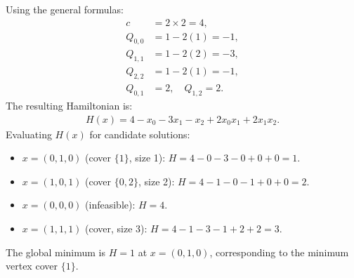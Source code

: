 \documentclass[12pt]{article}
\begin{document}
Using the general formulas:
\begin{align}
c &= 2 \times 2 = 4, \\
Q_{0,0} &= 1 - 2(1) = -1, \\
Q_{1,1} &= 1 - 2(2) = -3, \\
Q_{2,2} &= 1 - 2(1) = -1, \\
Q_{0,1} &= 2, \quad Q_{1,2} = 2.
\end{align}
The resulting Hamiltonian is:
\begin{align}
H(x) = 4 - x_0 - 3x_1 - x_2 + 2x_0 x_1 + 2x_1 x_2.
\end{align}
Evaluating $H(x)$ for candidate solutions:
\begin{itemize}
    \item $x = (0, 1, 0)$ (cover $\{1\}$, size 1): $H = 4 - 0 - 3 - 0 + 0 + 0 = 1$.
    \item $x = (1, 0, 1)$ (cover $\{0, 2\}$, size 2): $H = 4 - 1 - 0 - 1 + 0 + 0 = 2$.
    \item $x = (0, 0, 0)$ (infeasible): $H = 4$.
    \item $x = (1, 1, 1)$ (cover, size 3): $H = 4 - 1 - 3 - 1 + 2 + 2 = 3$.
\end{itemize}
The global minimum is $H=1$ at $x=(0, 1, 0)$, corresponding to the minimum vertex cover $\{1\}$.
\end{document}
